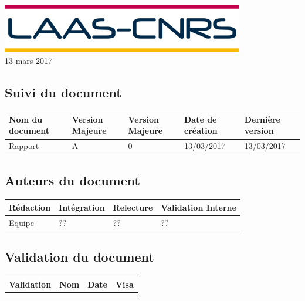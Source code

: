 \documentclass[10pt,a4paper]{article}
\begin{document}
\begin{titlepage}
\includegraphics[scale=0.3]{figures/laas.png} \\[1.1cm] 

\large 13 mars 2017
 

\end{titlepage}

\newpage


\subsection*{Suivi du document}

\begin{center}
    \begin{tabular}{| l | l | l | l | l |}
    \hline
     \rowcolor{gray} Nom du document & Version Majeure & Version Majeure & Date de création & Dernière version \\ \hline
    Rapport & A & 0 & 13/03/2017 & 13/03/2017 \\ \hline
    \end{tabular}
\end{center}


\subsection*{Auteurs du document}

\begin{center}
    \begin{tabular}{| l | l | l | l |}
    \hline
    \rowcolor{gray} Rédaction & Intégration & Relecture & Validation Interne \\ \hline
    Equipe & ?? & ?? & ?? \\ \hline

    \end{tabular}
\end{center}

\subsection*{Validation du document}

\begin{center}
    \begin{tabular}{| l | l | l | l |}
    \hline
     \rowcolor{gray} Validation & Nom & Date & Visa \\ \hline
    & & & \\
     \hline
    \end{tabular}
\end{center}
\end{document}
